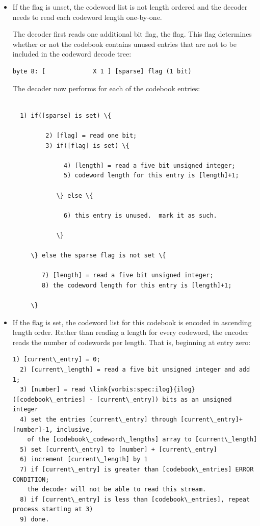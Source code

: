 \begin{itemize}
\item
  If the \varname{[ordered]} flag is unset, the codeword list is not
  length ordered and the decoder needs to read each codeword length
  one-by-one.

  The decoder first reads one additional bit flag, the
  \varname{[sparse]} flag.  This flag determines whether or not the
  codebook contains unused entries that are not to be included in the
  codeword decode tree:

\begin{Verbatim}[commandchars=\\\{\}]
byte 8: [             X 1 ] [sparse] flag (1 bit)
\end{Verbatim}

  The decoder now performs for each of the 
  codebook entries:

\begin{Verbatim}[commandchars=\\\{\}]

  1) if([sparse] is set) \{

         2) [flag] = read one bit;
         3) if([flag] is set) \{

              4) [length] = read a five bit unsigned integer;
              5) codeword length for this entry is [length]+1;

            \} else \{

              6) this entry is unused.  mark it as such.

            \}

     \} else the sparse flag is not set \{

        7) [length] = read a five bit unsigned integer;
        8) the codeword length for this entry is [length]+1;

     \}

\end{Verbatim}

\item
  If the \varname{[ordered]} flag is set, the codeword list for this
  codebook is encoded in ascending length order.  Rather than reading
  a length for every codeword, the encoder reads the number of
  codewords per length.  That is, beginning at entry zero:

\begin{Verbatim}[commandchars=\\\{\}]
  1) [current\_entry] = 0;
  2) [current\_length] = read a five bit unsigned integer and add 1;
  3) [number] = read \link{vorbis:spec:ilog}{ilog}([codebook\_entries] - [current\_entry]) bits as an unsigned integer
  4) set the entries [current\_entry] through [current\_entry]+[number]-1, inclusive,
    of the [codebook\_codeword\_lengths] array to [current\_length]
  5) set [current\_entry] to [number] + [current\_entry]
  6) increment [current\_length] by 1
  7) if [current\_entry] is greater than [codebook\_entries] ERROR CONDITION;
    the decoder will not be able to read this stream.
  8) if [current\_entry] is less than [codebook\_entries], repeat process starting at 3)
  9) done.
\end{Verbatim}


\end{itemize}
